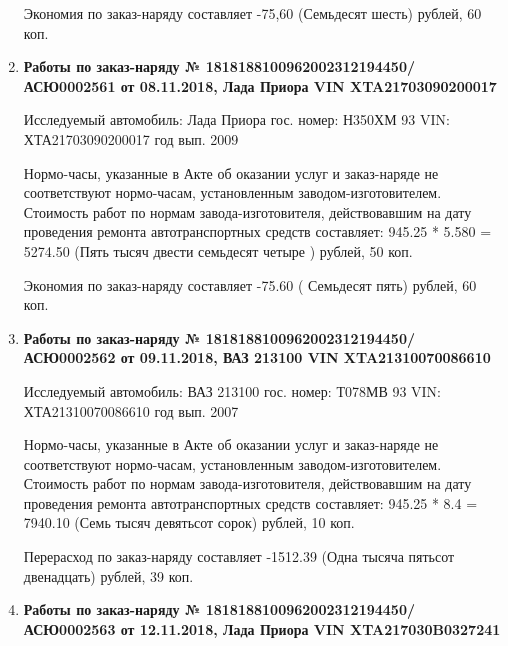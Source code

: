 \begin{enumerate}
Экономия по заказ-наряду составляет -75,60 (Семьдесят шесть) рублей, 60 коп.  
\vspace{3mm}




\item \par\textbf{{Работы по заказ-наряду  № 1818188100962002312194450/\-АСЮ0002561 от 08.11.2018, Лада Приора  VIN  XTA21703090200017
}}


Исследуемый автомобиль:  Лада Приора гос. номер: Н350ХМ 93 VIN: ХТА21703090200017 год вып. 2009








Нормо-часы, указанные в Акте об оказании услуг и заказ-наряде не соответствуют нормо-часам,  установленным заводом-изготовителем.\\
Стоимость работ по нормам завода-изготовителя, действовавшим на дату проведения ремонта автотранспортных средств составляет: 945.25 * 5.580 = 5274.50 (Пять тысяч двести семьдесят четыре ) рублей, 50 коп.

Экономия по заказ-наряду составляет -75.60 ( Семьдесят пять) рублей, 60 коп.  
\vspace{3mm}




\item \par\textbf{{Работы по заказ-наряду   № 1818188100962002312194450/\-АСЮ0002562 от 09.11.2018, ВАЗ 213100 VIN XTA21310070086610
}}


Исследуемый автомобиль:  ВАЗ 213100 гос. номер: Т078МВ 93 VIN: ХТА21310070086610 год вып. 2007




Нормо-часы, указанные в Акте об оказании услуг и заказ-наряде не соответствуют нормо-часам,  установленным заводом-изготовителем.\\
Стоимость работ по нормам завода-изготовителя, действовавшим на дату проведения ремонта автотранспортных средств составляет: 945.25 * 8.4 = 7940.10 (Семь тысяч девятьсот сорок) рублей, 10 коп.

Перерасход по заказ-наряду составляет -1512.39 (Одна тысяча пятьсот двенадцать) рублей, 39 коп.  
\vspace{3mm}





\item \par\textbf{{Работы по заказ-наряду   № 1818188100962002312194450/\-АСЮ0002563 от 12.11.2018, Лада Приора VIN  XTA217030B0327241
}}


\end{enumerate}
